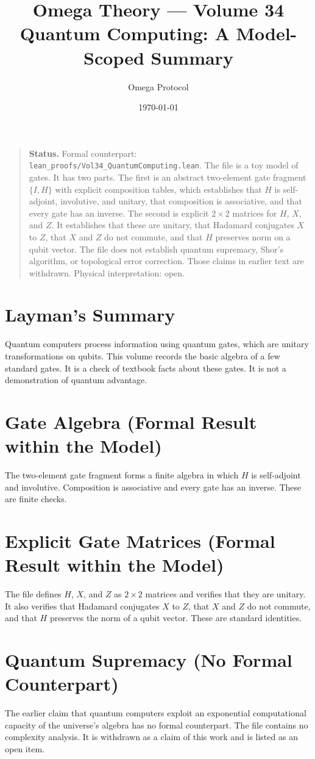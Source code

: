 \documentclass[11pt, a4paper]{article}
\title{Omega Theory --- Volume 34\\\Large Quantum Computing: A Model-Scoped Summary}
\author{Omega Protocol}
\date{\today}
\begin{document}
\maketitle

\begin{quote}
\textbf{Status.} Formal counterpart: \texttt{lean\_proofs/Vol34\_QuantumComputing.lean}. The file is a toy model of gates. It has two parts. The first is an abstract two-element gate fragment $\{I, H\}$ with explicit composition tables, which establishes that $H$ is self-adjoint, involutive, and unitary, that composition is associative, and that every gate has an inverse. The second is explicit $2 \times 2$ matrices for $H$, $X$, and $Z$. It establishes that these are unitary, that Hadamard conjugates $X$ to $Z$, that $X$ and $Z$ do not commute, and that $H$ preserves norm on a qubit vector. The file does not establish quantum supremacy, Shor's algorithm, or topological error correction. Those claims in earlier text are withdrawn. Physical interpretation: open.
\end{quote}

\section*{Layman's Summary}
Quantum computers process information using quantum gates, which are unitary transformations on qubits. This volume records the basic algebra of a few standard gates. It is a check of textbook facts about these gates. It is not a demonstration of quantum advantage.

\section{Gate Algebra (Formal Result within the Model)}
The two-element gate fragment forms a finite algebra in which $H$ is self-adjoint and involutive. Composition is associative and every gate has an inverse. These are finite checks.

\section{Explicit Gate Matrices (Formal Result within the Model)}
The file defines $H$, $X$, and $Z$ as $2 \times 2$ matrices and verifies that they are unitary. It also verifies that Hadamard conjugates $X$ to $Z$, that $X$ and $Z$ do not commute, and that $H$ preserves the norm of a qubit vector. These are standard identities.

\section{Quantum Supremacy (No Formal Counterpart)}
The earlier claim that quantum computers exploit an exponential computational capacity of the universe's algebra has no formal counterpart. The file contains no complexity analysis. It is withdrawn as a claim of this work and is listed as an open item.
\end{document}
